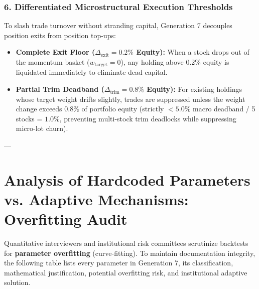 \documentclass[11pt,a4paper]{article}
\begin{document}
\subsubsection{6. Differentiated Microstructural Execution Thresholds}
To slash trade turnover without stranding capital, Generation 7 decouples position exits from position top-ups:
\begin{itemize}[leftmargin=*]
    \item \textbf{Complete Exit Floor ($\Delta_{\text{exit}} = 0.2\%$ Equity):} When a stock drops out of the momentum basket ($w_{\text{target}} = 0$), any holding above $0.2\%$ equity is liquidated immediately to eliminate dead capital.
    \item \textbf{Partial Trim Deadband ($\Delta_{\text{trim}} = 0.8\%$ Equity):} For existing holdings whose target weight drifts slightly, trades are suppressed unless the weight change exceeds $0.8\%$ of portfolio equity (strictly $< 5.0\%$ macro deadband / 5 stocks = $1.0\%$, preventing multi-stock trim deadlocks while suppressing micro-lot churn).
\end{itemize}

---

\section{Analysis of Hardcoded Parameters vs. Adaptive Mechanisms: Overfitting Audit}

Quantitative interviewers and institutional risk committees scrutinize backtests for \textbf{parameter overfitting} (curve-fitting). To maintain documentation integrity, the following table lists every parameter in Generation 7, its classification, mathematical justification, potential overfitting risk, and institutional adaptive solution.
\end{document}
